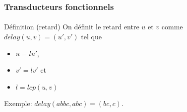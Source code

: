 \frametitle{Transducteurs fonctionnels}
\framesubtitle{}

\begin{block}{Définition (retard)}
	On définit le retard entre $u$ et $v$ comme $delay(u,v) = (u',v')$ tel que 
		\begin{itemize}
			\item $u = lu'$, 
			\item $v' = lv'$ et 
			\item $l = lcp(u,v)$
		\end{itemize}
\end{block}
\vspace{1cm}
\centering
Exemple: $delay(abbc, abc) = (bc, c)$.